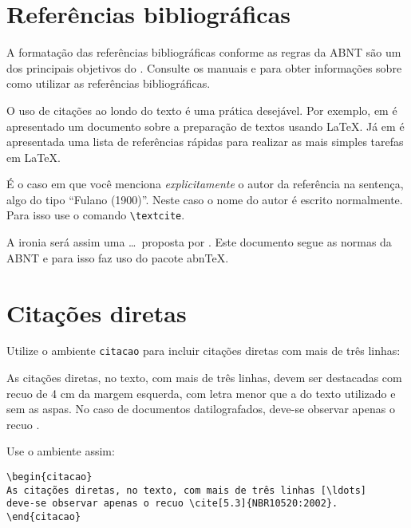 \section{Referências bibliográficas}\label{sec:referencias}

A formatação das referências bibliográficas conforme as regras da ABNT são um dos principais objetivos do \abnTeX. Consulte os manuais \textcite{abntex2cite} e \textcite{abntex2cite-alf} para obter informações sobre como utilizar as referências bibliográficas.


O uso de citações ao londo do texto é uma prática desejável. Por exemplo, em \cite{lamport94} é apresentado um documento sobre a preparação de textos usando \LaTeX. Já em \cite{goossens94} é apresentada uma lista de referências rápidas para realizar as mais simples tarefas em \LaTeX.

É o caso em que você menciona \emph{explicitamente} o autor da referência na sentença, algo
do tipo ``Fulano (1900)''. Neste caso o nome do autor é escrito
normalmente. Para isso use o comando \verb+\textcite+.

A ironia será assim uma \ldots\ proposta  por \textcite{lamport94}. Este documento segue as normas da ABNT e para isso faz uso do pacote abnTeX.


\section{Citações diretas}
\label{sec-citacao}

Utilize o ambiente \texttt{citacao} para incluir
citações diretas com mais de três linhas:

\begin{citacao}
As citações diretas, no texto, com mais de três linhas, devem ser
destacadas com recuo de 4 cm da margem esquerda, com letra menor que a do texto
utilizado e sem as aspas. No caso de documentos datilografados, deve-se
observar apenas o recuo \cite[5.3]{NBR10520:2002}.
\end{citacao}

Use o ambiente assim:

\begin{verbatim}
\begin{citacao}
As citações diretas, no texto, com mais de três linhas [\ldots] 
deve-se observar apenas o recuo \cite[5.3]{NBR10520:2002}.
\end{citacao}
\end{verbatim}

